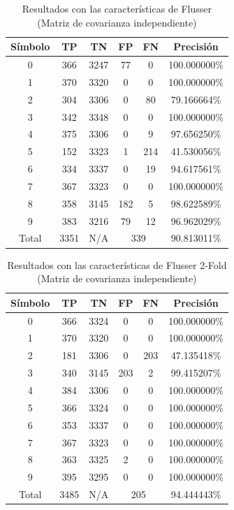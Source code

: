 \documentclass[a4paper, 11pt, oneside]{report}
\begin{document}
\begin{table}
\centering
\begin{tabular}{|c|c|c|c|c|c|}
	\hline
	Símbolo & TP & TN & FP & FN & Precisión \\ 
	\hline
	0 & 366 & 3247 & 77 & 0 & 100.000000\% \\ 
	1 & 370 & 3320 & 0 & 0 & 100.000000\% \\ 
	2 & 304 & 3306 & 0 & 80 & 79.166664\% \\ 
	3 & 342 & 3348 & 0 & 0 & 100.000000\% \\ 
	4 & 375 & 3306 & 0 & 9 & 97.656250\% \\ 
	5 & 152 & 3323 & 1 & 214 & 41.530056\% \\ 
	6 & 334 & 3337 & 0 & 19 & 94.617561\% \\ 
	7 & 367 & 3323 & 0 & 0 & 100.000000\% \\ 
	8 & 358 & 3145 & 182 & 5 & 98.622589\% \\ 
	9 & 383 & 3216 & 79 & 12 & 96.962029\% \\ 
	\hline
	Total & 3351 & N/A & \multicolumn{2}{|c|}{339} & 90.813011\% \\
	\hline
\end{tabular}
\caption{Resultados con las características de Flusser (Matriz de covarianza independiente)}
\label{tb:numFlIndep}
\end{table}

\begin{table}
\centering
\begin{tabular}{|c|c|c|c|c|c|}
	\hline
	Símbolo & TP & TN & FP & FN & Precisión \\ 
	\hline
	0 & 366 & 3324 & 0 & 0 & 100.000000\% \\ 
	1 & 370 & 3320 & 0 & 0 & 100.000000\% \\ 
	2 & 181 & 3306 & 0 & 203 & 47.135418\% \\ 
	3 & 340 & 3145 & 203 & 2 & 99.415207\% \\ 
	4 & 384 & 3306 & 0 & 0 & 100.000000\% \\ 
	5 & 366 & 3324 & 0 & 0 & 100.000000\% \\ 
	6 & 353 & 3337 & 0 & 0 & 100.000000\% \\ 
	7 & 367 & 3323 & 0 & 0 & 100.000000\% \\ 
	8 & 363 & 3325 & 2 & 0 & 100.000000\% \\ 
	9 & 395 & 3295 & 0 & 0 & 100.000000\% \\ 
	\hline
	Total & 3485 & N/A & \multicolumn{2}{|c|}{205} & 94.444443\% \\
	\hline
\end{tabular}
\caption{Resultados con las características de Flusser 2-Fold (Matriz de covarianza independiente)}
\label{tb:numRotIndep}
\end{table}
\end{document}
